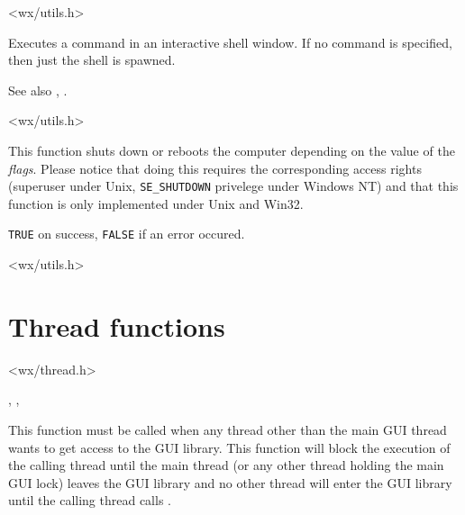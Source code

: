 <wx/utils.h>

\label{wxshell}


Executes a command in an interactive shell window. If no command is
specified, then just the shell is spawned.

See also , .


<wx/utils.h>

\label{wxshutdown}


This function shuts down or reboots the computer depending on the value of the 
{\it flags}. Please notice that doing this requires the corresponding access
rights (superuser under Unix, {\tt SE\_SHUTDOWN} privelege under Windows NT)
and that this function is only implemented under Unix and Win32.




{\tt TRUE} on success, {\tt FALSE} if an error occured.


<wx/utils.h>

\section{Thread functions}\label{threadfunctions}


<wx/thread.h>


, , 

\label{wxmutexguienter}


This function must be called when any thread other than the main GUI thread
wants to get access to the GUI library. This function will block the execution
of the calling thread until the main thread (or any other thread holding the
main GUI lock) leaves the GUI library and no other thread will enter the GUI
library until the calling thread calls .

